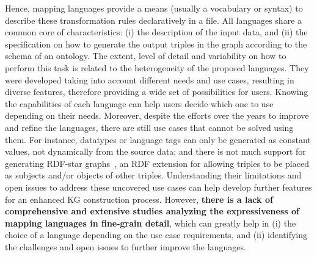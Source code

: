 
 Hence, mapping languages provide a means (usually a vocabulary or syntax) to describe these transformation rules declaratively in a file. 
 All languages share a common core of characteristics: (i) the description of the input data, and (ii) the specification on how to generate the output triples in the graph according to the schema of an ontology. 
 The extent, level of detail and variability on how to perform this task is related to the heterogeneity of the proposed languages. 
 They were developed taking into account different needs and use cases, resulting in diverse features, therefore providing a wide set of possibilities for users.
 Knowing the capabilities of each language can help users decide which one to use depending on their needs. 
 Moreover, despite the efforts over the years to improve and refine the languages, there are still use cases that cannot be solved using them. For instance, datatypes or language tags can only be generated as constant values, not dynamically from the source data; and there is not much support for generating RDF-star graphs~\parencite{hartig2017foundations}, an RDF extension for allowing triples to be placed as subjects and/or objects of other triples. 
 Understanding their limitations and open issues to address these uncovered use cases can help develop further features for an enhanced KG construction process.
 However, \textbf{there is a lack of comprehensive and extensive studies analyzing the expressiveness of mapping languages in fine-grain detail}, which can greatly help in (i) the choice of a language depending on the use case requirements, and (ii) identifying the challenges and open issues to further improve the languages. 
 


